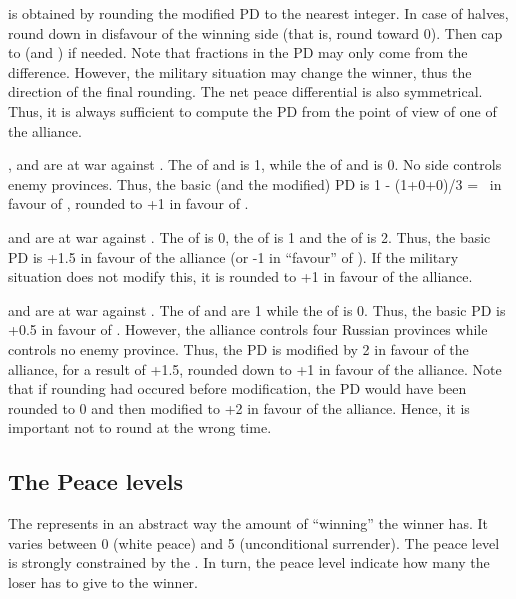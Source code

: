  is obtained by rounding the modified PD to
the nearest integer. In case of halves, round down in disfavour of the winning
side (that is, round toward 0). Then cap to  (and ) if
needed.
\bparag Note that fractions in the PD may only come from the \STAB
difference. However, the military situation may change the winner, thus the
direction of the final rounding.
\bparag The net peace differential is also symmetrical. Thus, it is always
sufficient to compute the PD from the point of view of one of the alliance.

\begin{exemple}[Rounding PD]
  \SUE, \POL and \TUR are at war against \RUS. The \STAB of \RUS and \SUE is
  1, while the \STAB of \POL and \TUR is 0. No side controls enemy
  provinces. Thus, the basic (and the modified) PD is 1 - (1+0+0)/3 = \td\ in
  favour of \RUS, rounded to +1 in favour of \RUS.
  
  \smallskip

  \SUE and \TUR are at war against \RUS. The \STAB of \RUS is 0, the \STAB of
  \TUR is 1 and the \STAB of \SUE is 2. Thus, the basic PD is +1.5 in favour
  of the alliance (or -1 in ``favour'' of \RUS). If the military situation
  does not modify this, it is rounded to +1 in favour of the alliance.

  \smallskip

  \SUE and \TUR are at war against \RUS. The \STAB of \RUS and \TUR are 1
  while the \STAB of \SUE is 0. Thus, the basic PD is +0.5 in favour of
  \RUS. However, the alliance controls four Russian provinces while \RUS
  controls no enemy province. Thus, the PD is modified by 2 in favour of the
  alliance, for a result of +1.5, rounded down to +1 in favour of the
  alliance. Note that if rounding had occured before modification, the PD
  would have been rounded to 0 and then modified to +2 in favour of the
  alliance. Hence, it is important not to round at the wrong time.
\end{exemple}

\subsection{The Peace levels}
The  represents in an abstract way the amount of
``winning'' the winner has. It varies between 0 (white peace) and 5
(unconditional surrender). The peace level is strongly constrained by the
. In turn, the peace level indicate how many
 the loser has to give to the winner.

